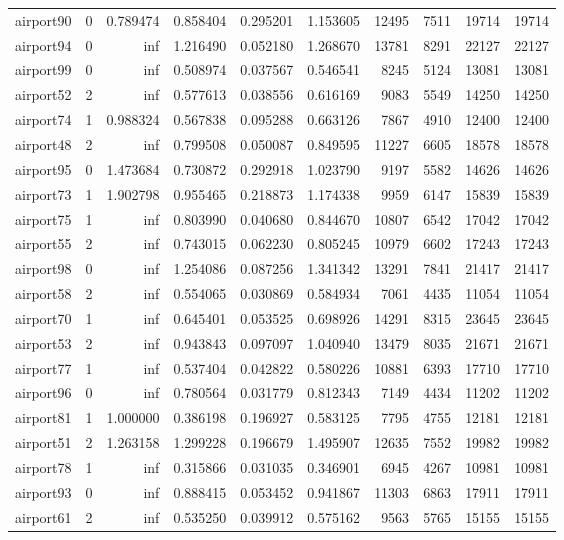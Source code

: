 \begin{longtable}{|l|r|r|r|r|r|r|r|r|r|}
airport90 & 0 & 0.789474 & 0.858404 & 0.295201 & 1.153605 & 12495 & 7511 & 19714 & 19714 \\
airport94 & 0 & inf & 1.216490 & 0.052180 & 1.268670 & 13781 & 8291 & 22127 & 22127 \\
airport99 & 0 & inf & 0.508974 & 0.037567 & 0.546541 & 8245 & 5124 & 13081 & 13081 \\
airport52 & 2 & inf & 0.577613 & 0.038556 & 0.616169 & 9083 & 5549 & 14250 & 14250 \\
airport74 & 1 & 0.988324 & 0.567838 & 0.095288 & 0.663126 & 7867 & 4910 & 12400 & 12400 \\
airport48 & 2 & inf & 0.799508 & 0.050087 & 0.849595 & 11227 & 6605 & 18578 & 18578 \\
airport95 & 0 & 1.473684 & 0.730872 & 0.292918 & 1.023790 & 9197 & 5582 & 14626 & 14626 \\
airport73 & 1 & 1.902798 & 0.955465 & 0.218873 & 1.174338 & 9959 & 6147 & 15839 & 15839 \\
airport75 & 1 & inf & 0.803990 & 0.040680 & 0.844670 & 10807 & 6542 & 17042 & 17042 \\
airport55 & 2 & inf & 0.743015 & 0.062230 & 0.805245 & 10979 & 6602 & 17243 & 17243 \\
airport98 & 0 & inf & 1.254086 & 0.087256 & 1.341342 & 13291 & 7841 & 21417 & 21417 \\
airport58 & 2 & inf & 0.554065 & 0.030869 & 0.584934 & 7061 & 4435 & 11054 & 11054 \\
airport70 & 1 & inf & 0.645401 & 0.053525 & 0.698926 & 14291 & 8315 & 23645 & 23645 \\
airport53 & 2 & inf & 0.943843 & 0.097097 & 1.040940 & 13479 & 8035 & 21671 & 21671 \\
airport77 & 1 & inf & 0.537404 & 0.042822 & 0.580226 & 10881 & 6393 & 17710 & 17710 \\
airport96 & 0 & inf & 0.780564 & 0.031779 & 0.812343 & 7149 & 4434 & 11202 & 11202 \\
airport81 & 1 & 1.000000 & 0.386198 & 0.196927 & 0.583125 & 7795 & 4755 & 12181 & 12181 \\
airport51 & 2 & 1.263158 & 1.299228 & 0.196679 & 1.495907 & 12635 & 7552 & 19982 & 19982 \\
airport78 & 1 & inf & 0.315866 & 0.031035 & 0.346901 & 6945 & 4267 & 10981 & 10981 \\
airport93 & 0 & inf & 0.888415 & 0.053452 & 0.941867 & 11303 & 6863 & 17911 & 17911 \\
airport61 & 2 & inf & 0.535250 & 0.039912 & 0.575162 & 9563 & 5765 & 15155 & 15155 \\

\end{longtable}
